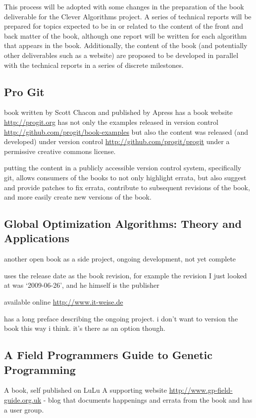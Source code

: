 \documentclass[a4paper, 11pt]{article}
\begin{document}
This process will be adopted with some changes in the preparation of the book deliverable for the Clever Algorithms project. A series of technical reports will be prepared for topics expected to be in or related to the content of the front and back matter of the book, although one report will be written for each algorithm that appears in the book. Additionally, the content of the book (and potentially other deliverables such as a website) are proposed to be developed in parallel with the technical reports in a series of discrete milestones. 
 
% 
% 
\subsection{Pro Git}
book written by Scott Chacon and published by Apress \cite{Chacon2009}
has a book website \url{http://progit.org}
has not only the examples released in version control \url{http://github.com/progit/book-examples} but also the content was released (and developed) under version control \url{http://github.com/progit/progit} under a permissive creative commons license. 

putting the content in a publicly accessible version control system, specifically git, allows consumers of the books to not only highlight errata, but also suggest and provide patches to fix errata, contribute to subsequent revisions of the book, and more easily create new versions of the book.



\subsection{Global Optimization Algorithms: Theory and Applications}
another open book as a side project, ongoing development, not yet complete \cite{Weise2007}

uses the release date as the book revision, for example the revision I just looked at was `2009-06-26', and he himself is the publisher

available online \url{http://www.it-weise.de}

has a long preface describing the ongoing project. i don't want to version the book this way i think. it's there as an option though.


\subsection{A Field Programmers Guide to Genetic Programming}
A book, self published on LuLu \cite{Poli2008}
A supporting website \url{http://www.gp-field-guide.org.uk} - blog that documents happenings and errata from the book and has a user group.
\end{document}
